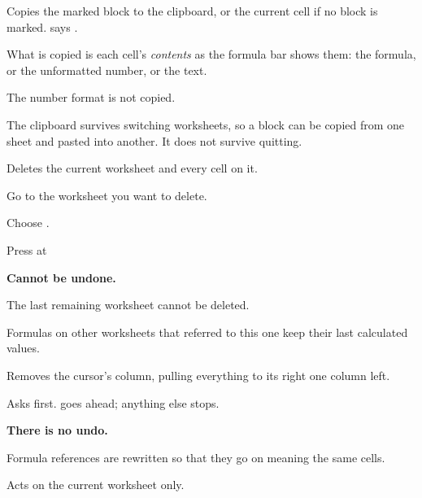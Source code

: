 
Copies the marked block to the clipboard, or the current cell if no block is
marked. \ccprod{} says .

\begin{ccsteps}
\item What is copied is each cell's \emph{contents} as the formula bar shows
them: the formula, or the unformatted number, or the text.
\item The number format is not copied.
\item The clipboard survives switching worksheets, so a block can be copied
from one sheet and pasted into another. It does not survive quitting.
\end{ccsteps}


Deletes the current worksheet and every cell on it.

\begin{ccprocedure}[]
\item Go to the worksheet you want to delete.
\item Choose .
\item Press  at 
\end{ccprocedure}

\begin{ccsteps}
\item \textbf{Cannot be undone.}
\item The last remaining worksheet cannot be deleted.
\item Formulas on other worksheets that referred to this one keep their last
calculated values.
\end{ccsteps}


Removes the cursor's column, pulling everything to its right one column left.

\begin{ccsteps}
\item Asks  first.  goes ahead; anything else
stops.
\item \textbf{There is no undo.}
\item Formula references are rewritten so that they go on meaning the same
cells.
\item Acts on the current worksheet only.
\end{ccsteps}

